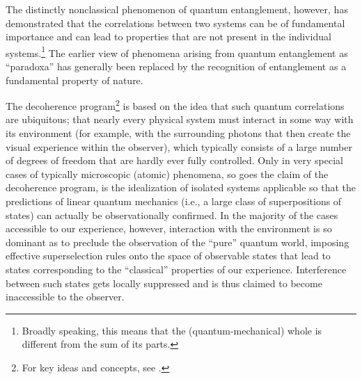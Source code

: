 \documentclass[rmp,aps,amsmath,amsfonts,noshowkeys,noshowpacs,12pt]{revtex4}
\begin{document}
The distinctly nonclassical phenomenon of quantum entanglement,
however, has demonstrated that the correlations between two systems
can be of fundamental importance and can lead to properties that are
not present in the individual systems.\footnote{Broadly speaking,
  this means that the (quantum-mechanical) whole is different
  from the sum of its parts.} The earlier view of phenomena arising
from quantum entanglement as ``paradoxa'' has generally been replaced
by the recognition of entanglement as a fundamental property of
nature.

The decoherence program\footnote{For key ideas and concepts, see
  \citet{Zeh:1970:yt,Kubler:1973:ux,Zeh:1973:wq,Zeh:1995:jg,%
Zeh:1996:gy,Zeh:1999:qr,Joos:1985:iu,Zurek:1981:dd,Zurek:1982:tv,%
Zurek:1991:vv,Zurek:1993:pu,Zurek:2002:ii,Joos:2003:jh}.}  is based on
the idea that such quantum correlations are ubiquitous; that nearly
every physical system must interact in some way with its environment
(for example, with the surrounding photons that then create the visual
experience within the observer), which typically consists of a large
number of degrees of freedom that are hardly ever fully controlled.
Only in very special cases of typically microscopic (atomic)
phenomena, so goes the claim of the decoherence program, is the
idealization of isolated systems applicable so that the predictions of
linear quantum mechanics (i.e., a large class of superpositions of
states) can actually be observationally confirmed. In the majority of
the cases accessible to our experience, however, interaction with the
environment is so dominant as to preclude the observation of the
``pure'' quantum world, imposing effective superselection rules
\citep{Wick:1952:pp,Wick:1970:iz,Galindo:1962:tl,Wightman:1995:ug,Cisnerosy:1998:kz,Giulini:2000:ry}
onto the space of observable states that lead to states corresponding
to the ``classical'' properties of our experience. Interference
between such states gets locally suppressed and is thus claimed to
become inaccessible to the observer.
\end{document}
